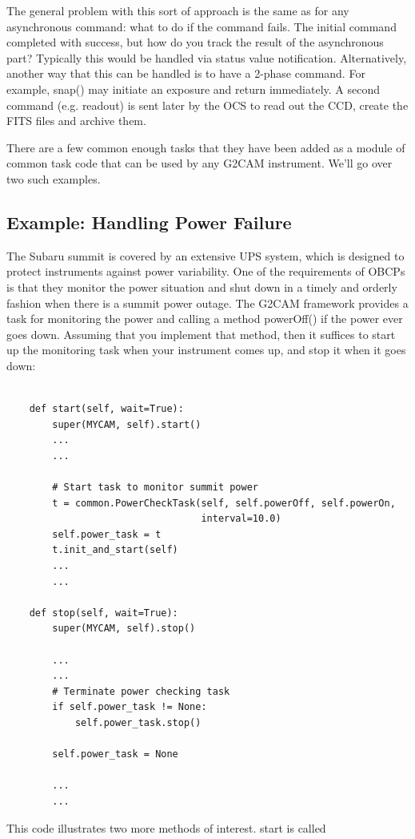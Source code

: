 \documentclass[11pt]{report}
\begin{document}
The general problem with this sort of approach is the same as for any
asynchronous command: what to do if the command fails. The initial
command completed with success, but how do you track the result of the
asynchronous part? Typically this would be handled via status value
notification. Alternatively, another way that this can be handled is to
have a 2-phase command. For example, snap() may initiate an exposure and
return immediately. A second command (e.g. readout) is sent later by the
OCS to read out the CCD, create the FITS files and archive them. 

There are a few common enough tasks that they have been added as a
module of common task code that can be used by any G2CAM
instrument. We'll go over two such examples. 

\subsection{Example: Handling Power Failure}
The Subaru summit is covered by an extensive UPS system, which is
designed to protect instruments against power variability. One of the
requirements of OBCPs is that they monitor the power situation and shut
down in a timely and orderly fashion when there is a summit power
outage. The G2CAM framework provides a task for monitoring the power
and calling a method powerOff() if the power ever goes down. Assuming
that you implement that method, then it suffices to start up the
monitoring task when your instrument comes up, and stop it when it goes
down: 
\begin{verbatim}

    def start(self, wait=True):
        super(MYCAM, self).start()
        ...
        ...

        # Start task to monitor summit power
        t = common.PowerCheckTask(self, self.powerOff, self.powerOn,
                                  interval=10.0)
        self.power_task = t
        t.init_and_start(self)
        ...
        ...

    def stop(self, wait=True):
        super(MYCAM, self).stop()
        
        ...
        ...
        # Terminate power checking task
        if self.power_task != None:
            self.power_task.stop()

        self.power_task = None

        ...
        ...

\end{verbatim}
This code illustrates two more methods of interest. start is called
\end{document}
